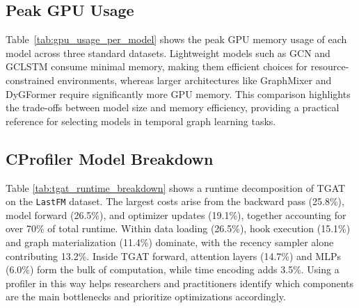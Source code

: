 \subsection{Peak GPU Usage}
\label{sec:gpu}
\noindent
\begin{minipage}{0.45\textwidth}  %
Table~\ref{tab:gpu_usage_per_model} shows the peak GPU memory usage of each model across three standard datasets. Lightweight models such as GCN and GCLSTM consume minimal memory, making them efficient choices for resource-constrained environments, whereas larger architectures like GraphMixer and DyGFormer require significantly more GPU memory. This comparison highlights the trade-offs between model size and memory efficiency, providing a practical reference for selecting models in temporal graph learning tasks.
\end{minipage}%
\hfill
\begin{minipage}{0.50\textwidth}  %
\centering
{}
\label{tab:gpu_usage_per_model}
\end{minipage}


\subsection{CProfiler Model Breakdown}
\label{sec:profiler}

Table \ref{tab:tgat_runtime_breakdown} shows a runtime decomposition of TGAT on the \texttt{LastFM} dataset. The largest costs arise from the backward pass (25.8\%), model forward (26.5\%), and optimizer updates (19.1\%), together accounting for over 70\% of total runtime. Within data loading (26.5\%), hook execution (15.1\%) and graph materialization (11.4\%) dominate, with the recency sampler alone contributing 13.2\%. Inside TGAT forward, attention layers (14.7\%) and MLPs (6.0\%) form the bulk of computation, while time encoding adds 3.5\%. Using a profiler in this way helps researchers and practitioners identify which components are the main bottlenecks and prioritize optimizations accordingly.

